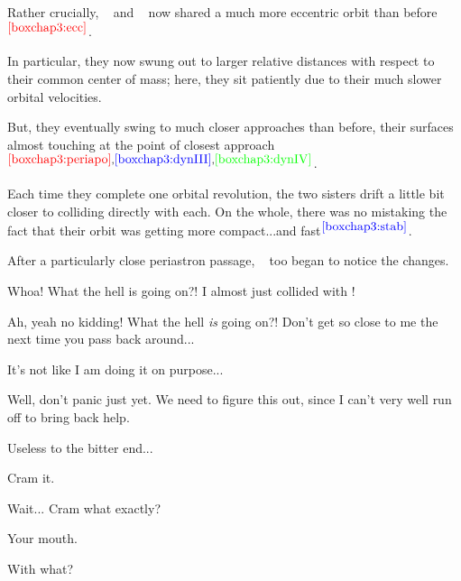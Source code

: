 \documentclass[main.tex]{subfiles}
\begin{document}
\par \nar Rather crucially, \rmtaygete~ and \rmalcyone~ now shared a much more eccentric orbit than before$^{\textcolor{red}{\ref{boxchap3:ecc}}}$.

\par \nar In particular, they now swung out to larger relative distances with respect to their common center of mass; here, they sit patiently due to their much slower orbital velocities. 

\par \nar But, they eventually swing to much closer approaches than before, their surfaces almost touching at the point of closest approach$^{\textcolor{red}{\ref{boxchap3:periapo}},\textcolor{blue}{\ref{boxchap3:dynIII}},\textcolor{green}{\ref{boxchap3:dynIV}}}$.

\par \nar Each time they complete one orbital revolution, the two sisters drift a little bit closer to colliding directly with each.  On the whole, there was no mistaking the fact that their orbit was getting more compact...and fast$^{\textcolor{blue}{\ref{boxchap3:stab}}}$.

\par \nar After a particularly close periastron passage, \rmtaygete~ too began to notice the changes.

\par \Taygete  Whoa!  What the hell is going on?!  I almost just collided with \rmalcyone!

\par \Alcyone Ah, yeah no kidding!  What the hell \textit{is} going on?!  Don't get so close to me the next time you pass back around...

\par \Taygete It's not like I am doing it on purpose...

\par \Celaeno  Well, don't panic just yet.  We need to figure this out, since I can't very well run off to bring back help.

\par \Alcyone Useless to the bitter end...

\par \Celaeno Cram it.  

\par \Alcyone Wait... Cram what exactly?

\par \Celaeno Your mouth.  

\par \Alcyone With what?
\end{document}
